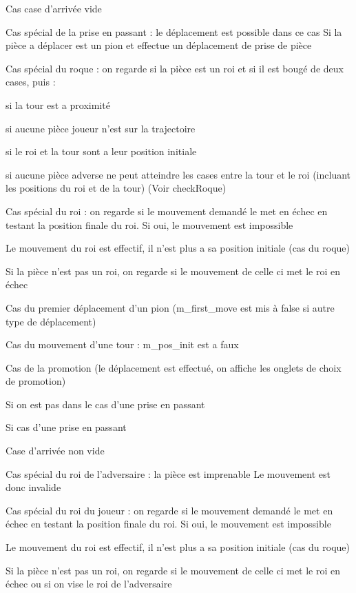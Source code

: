\-Cas case d'arrivée vide

\-Cas spécial de la prise en passant \-: le déplacement est possible dans ce cas \-Si la pièce a déplacer est un pion et effectue un déplacement de prise de pièce

\-Cas spécial du roque \-: on regarde si la pièce est un roi et si il est bougé de deux cases, puis \-:
\begin{DoxyItemize}
\item si la tour est a proximité
\item si aucune pièce joueur n'est sur la trajectoire
\item si le roi et la tour sont a leur position initiale
\item si aucune pièce adverse ne peut atteindre les cases entre la tour et le roi (incluant les positions du roi et de la tour) (\-Voir check\-Roque)
\end{DoxyItemize}

\-Cas spécial du roi \-: on regarde si le mouvement demandé le met en échec en testant la position finale du roi. \-Si oui, le mouvement est impossible

\-Le mouvement du roi est effectif, il n'est plus a sa position initiale (cas du roque)

\-Si la pièce n'est pas un roi, on regarde si le mouvement de celle ci met le roi en échec

\-Cas du premier déplacement d'un pion (m\-\_\-first\-\_\-move est mis à false si autre type de déplacement)

\-Cas du mouvement d'une tour \-: m\-\_\-pos\-\_\-init est a faux

\-Cas de la promotion (le déplacement est effectué, on affiche les onglets de choix de promotion)

\-Si on est pas dans le cas d'une prise en passant

\-Si cas d'une prise en passant

\-Case d'arrivée non vide

\-Cas spécial du roi de l'adversaire \-: la pièce est imprenable \-Le mouvement est donc invalide

\-Cas spécial du roi du joueur \-: on regarde si le mouvement demandé le met en échec en testant la position finale du roi. \-Si oui, le mouvement est impossible

\-Le mouvement du roi est effectif, il n'est plus a sa position initiale (cas du roque)

\-Si la pièce n'est pas un roi, on regarde si le mouvement de celle ci met le roi en échec ou si on vise le roi de l'adversaire

